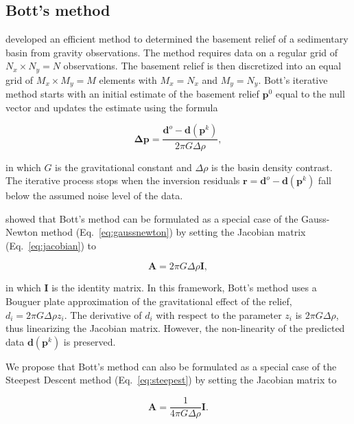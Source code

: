 \documentclass[extra]{gji}
\begin{document}
\subsection{Bott's method}

\citet{bott1960} developed an efficient method to determined the basement
relief of a sedimentary basin from gravity observations.
The method requires data on a regular grid of $N_x \times N_y = N$
observations.
The basement relief is then discretized into an equal grid of $M_x \times
M_y = M$ elements with $M_x = N_x$ and $M_y = N_y$.
Bott's iterative method starts with an initial estimate of the basement relief
$\mathbf{p}^0$ equal to the null vector and updates the estimate using the formula

\begin{equation}
    \mathbf{\Delta p} = \dfrac{\mathbf{d}^o - \mathbf{d}(\mathbf{p}^k)}{2\pi G \Delta \rho},
    \label{eq:bott}
\end{equation}

\noindent
in which $G$ is the gravitational constant and $\Delta \rho$ is the basin
density contrast.
The iterative process stops when the inversion residuals
$\mathbf{r} = \mathbf{d}^o - \mathbf{d}(\mathbf{p}^k)$ fall below the assumed noise level
of the data.

\citet{silva2014} showed that Bott's method can be formulated as
a special case of the Gauss-Newton method (Eq.~\ref{eq:gaussnewton})
by setting the Jacobian matrix (Eq.~\ref{eq:jacobian}) to

\begin{equation}
    \mathbf{A} = 2\pi G \Delta \rho \mathbf{I},
    \label{eq:bott-gaussnewton}
\end{equation}

\noindent
in which $\mathbf{I}$ is the identity matrix.
In this framework,
Bott's method uses a Bouguer plate approximation of the gravitational effect of
the relief, $d_i = 2\pi G \Delta\rho z_i$.
The derivative of $d_i$ with respect to the parameter $z_i$ is
$2\pi G \Delta \rho$, thus linearizing the Jacobian matrix.
However, the non-linearity of the predicted data $\mathbf{d}(\mathbf{p}^k)$ is
preserved.

We propose that Bott's method can also be formulated as a special case of the
Steepest Descent method (Eq.~\ref{eq:steepest}) by setting the Jacobian matrix to

\begin{equation}
    \mathbf{A} = \dfrac{1}{4 \pi G \Delta \rho}\mathbf{I}.
    \label{eq:bott-steepest}
\end{equation}
\end{document}
